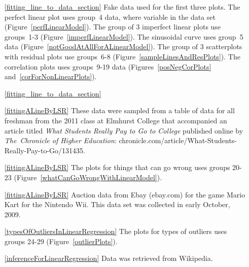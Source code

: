 \begin{itemize}
\setlength{\itemsep}{0mm}
\item[\ref{fitting_line_to_data_section}]
    Fake data used for the first three plots.
    The perfect linear plot uses group~4 data,
    where  variable in the data set
    (Figure~\ref{perfLinearModel}).
    The group of 3 imperfect linear plots use groups~1-3
    (Figure~\ref{imperfLinearModel}).
    The sinusoidal curve uses group~5 data
    (Figure~\ref{notGoodAtAllForALinearModel}).
    The group of 3 scatterplots with residual plots use groups~6-8
    (Figure~\ref{sampleLinesAndResPlots}).
    The correlation plots uses groups~9-19 data
    (Figures~\ref{posNegCorPlots} and~\ref{corForNonLinearPlots}).
\item[\ref{fitting_line_to_data_section}]

\item[\ref{fittingALineByLSR}]
    These data were sampled from a table of data for all
    freshman from the 2011 class at Elmhurst College that
    accompanied an article titled
    \emph{What Students Really Pay to Go to College}
    published online by \emph{The~Chronicle of Higher Education}:
        {chronicle.com/article/What-Students-Really-Pay-to-Go/131435}.
\item[\ref{fittingALineByLSR}]
    The plots for things that can go wrong uses groups 20-23
    (Figure~\ref{whatCanGoWrongWithLinearModel}).
\item[\ref{fittingALineByLSR}]
    Auction data from Ebay (ebay.com) for the game Mario Kart
    for the Nintendo Wii.
    This data set was collected in early October, 2009.

\item[\ref{typesOfOutliersInLinearRegression}]
    The plots for types of outliers uses groups 24-29
    (Figure~\ref{outlierPlots}).

\item[\ref{inferenceForLinearRegression}]
    Data was retrieved from Wikipedia.

\end{itemize}







